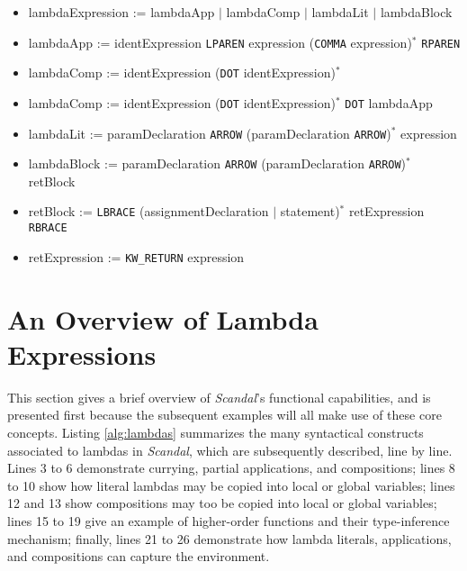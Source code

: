 \begin{itemize}
	\item lambdaExpression := lambdaApp $|$ lambdaComp $|$ lambdaLit $|$ lambdaBlock
	\item lambdaApp := identExpression \texttt{LPAREN} expression (\texttt{COMMA} expression)$^*$ \texttt{RPAREN}
	\item lambdaComp := identExpression (\texttt{DOT} identExpression)$^*$
	\item lambdaComp := identExpression (\texttt{DOT} identExpression)$^*$ \texttt{DOT} lambdaApp
	\item lambdaLit := paramDeclaration \texttt{ARROW} (paramDeclaration \texttt{ARROW})$^*$ expression
	\item lambdaBlock := paramDeclaration \texttt{ARROW} (paramDeclaration \texttt{ARROW})$^*$ retBlock
	\item retBlock := \texttt{LBRACE} (assignmentDeclaration $|$ statement)$^*$ retExpression \texttt{RBRACE}
	\item retExpression := \texttt{KW\_RETURN} expression
\end{itemize}

\section{An Overview of Lambda Expressions}

This section gives a brief overview of \emph{Scandal}'s functional capabilities, and is presented first because the subsequent examples will all make use of these core concepts. Listing \ref{alg:lambdas} summarizes the many syntactical constructs associated to lambdas in \emph{Scandal}, which are subsequently described, line by line. Lines 3 to 6 demonstrate currying, partial applications, and compositions; lines 8 to 10 show how literal lambdas may be copied into local or global variables; lines 12 and 13 show compositions may too be copied into local or global variables; lines 15 to 19 give an example of higher-order functions and their type-inference mechanism; finally, lines 21 to 26 demonstrate how lambda literals, applications, and compositions can capture the environment. 

